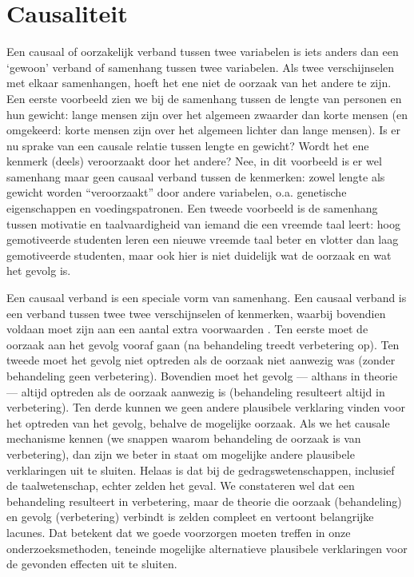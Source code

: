 \documentclass[
]{book}
\begin{document}
\hypertarget{sec:causaliteit}{%
\section{Causaliteit}\label{sec:causaliteit}}

Een causaal of oorzakelijk verband tussen twee variabelen is iets anders
dan een `gewoon' verband of samenhang tussen twee variabelen. Als twee
verschijnselen met elkaar samenhangen, hoeft het ene niet de oorzaak van
het andere te zijn. Een eerste voorbeeld zien we bij de samenhang tussen
de lengte van personen en hun gewicht: lange mensen zijn over het
algemeen zwaarder dan korte mensen (en omgekeerd: korte mensen zijn over
het algemeen lichter dan lange mensen). Is er nu sprake van een causale
relatie tussen lengte en gewicht? Wordt het ene kenmerk (deels)
veroorzaakt door het andere? Nee, in dit voorbeeld is er wel samenhang
maar geen causaal verband tussen de kenmerken: zowel lengte als gewicht
worden ``veroorzaakt'' door andere variabelen, o.a. genetische
eigenschappen en voedingspatronen. Een tweede voorbeeld is de samenhang
tussen motivatie en taalvaardigheid van iemand die een vreemde taal
leert: hoog gemotiveerde studenten leren een nieuwe vreemde taal beter
en vlotter dan laag gemotiveerde studenten, maar ook hier is niet
duidelijk wat de oorzaak en wat het gevolg is.

Een causaal verband is een speciale vorm van samenhang. Een causaal
verband is een verband tussen twee twee verschijnselen of kenmerken,
waarbij bovendien voldaan moet zijn aan een aantal extra voorwaarden
\citep{SCC02}. Ten eerste moet de oorzaak aan het gevolg vooraf gaan (na
behandeling treedt verbetering op). Ten tweede moet het gevolg niet
optreden als de oorzaak niet aanwezig was (zonder behandeling geen
verbetering). Bovendien moet het gevolg --- althans in theorie ---
altijd optreden als de oorzaak aanwezig is (behandeling resulteert
altijd in verbetering). Ten derde kunnen we geen andere plausibele
verklaring vinden voor het optreden van het gevolg, behalve de mogelijke
oorzaak. Als we het causale mechanisme kennen (we snappen waarom
behandeling de oorzaak is van verbetering), dan zijn we beter in staat
om mogelijke andere plausibele verklaringen uit te sluiten. Helaas is
dat bij de gedragswetenschappen, inclusief de taalwetenschap, echter
zelden het geval. We constateren wel dat een behandeling resulteert in
verbetering, maar de theorie die oorzaak (behandeling) en gevolg
(verbetering) verbindt is zelden compleet en vertoont belangrijke
lacunes. Dat betekent dat we goede voorzorgen moeten treffen in onze
onderzoeksmethoden, teneinde mogelijke alternatieve plausibele
verklaringen voor de gevonden effecten uit te sluiten.
\end{document}
